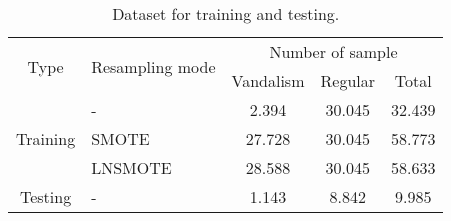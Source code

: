 \begin{table}[tp]
\caption{Dataset for training and testing.}
\centering
\begin{tabular}{|| c | l | c | c | c ||}
\hline
\multirow{2}{*}{Type} & \multirow{2}{*}{Resampling mode}
	& \multicolumn{3}{c||}{Number of sample} \\
\cline{3-5}
    & & Vandalism & Regular & Total \\
\hline
\hline
\multirow{3}{*}{Training} & -       &  2.394 & 30.045 & 32.439 \\
                              & SMOTE   & 27.728 & 30.045 & 58.773 \\
                              & LNSMOTE & 28.588 & 30.045 & 58.633 \\
\hline
Testing & - & 1.143 & 8.842 & 9.985 \\
\hline
\end{tabular}
\label{table:dataset}
\end{table}
